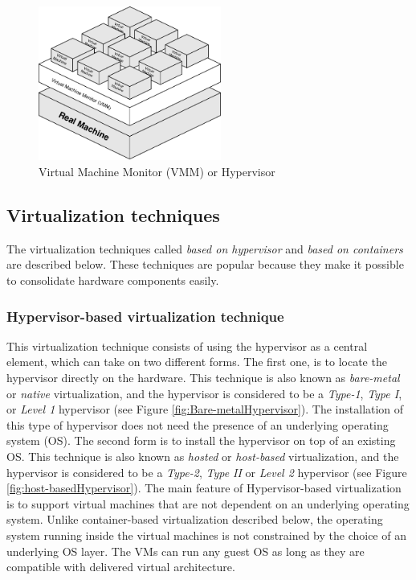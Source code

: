     \begin{figure}[H]
        \centering
        \includegraphics[width=6cm]{images/VMM.pdf}
        \vspace{0.2mm}
        \caption{Virtual Machine Monitor (VMM) or Hypervisor}
        \label{fig:VMM}
    \end{figure}

	\subsection{Virtualization techniques}
	
	The virtualization techniques called \textit{based on hypervisor} and \textit {based on containers} are described below. 
	These techniques are popular because they make it possible to consolidate hardware components easily.
	
	\subsubsection{Hypervisor-based virtualization technique}
	
	This virtualization technique consists of using the hypervisor as a central element, which can take on two different forms. The first one, is to locate the hypervisor directly on the hardware. 
	This technique is also known as  \textit{bare-metal} or \textit{native} virtualization, and the hypervisor is considered to be a \textit{Type-1}, \textit{Type I},  or \textit{Level 1} hypervisor (see Figure \ref{fig:Bare-metalHypervisor}). 
	The installation of this type of hypervisor does not need the presence of an underlying operating system (OS). The second form is to install the hypervisor on top of an existing OS. 
	This technique is also known as  \textit{hosted} or \textit{host-based} virtualization, and the hypervisor is considered to be a \textit{Type-2}, \textit{Type II}  or \textit{Level 2} hypervisor (see Figure \ref{fig:host-basedHypervisor}). 
	The main feature of Hypervisor-based virtualization is to support virtual machines that are not dependent on an underlying operating system. Unlike container-based virtualization described below, the operating system running inside the virtual machines is not constrained by the choice of an underlying OS layer. The VMs can run any guest OS as long as they are compatible with delivered virtual architecture.

